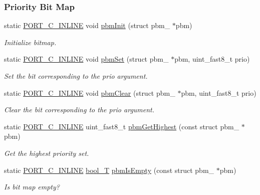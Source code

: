 \subsubsection*{Priority Bit Map}
\begin{DoxyCompactItemize}
\item 
static \hyperlink{group__template__compiler_ga87952d6e574c7f437503926e833ba345}{P\-O\-R\-T\-\_\-\-C\-\_\-\-I\-N\-L\-I\-N\-E} void \hyperlink{group__kern__impl_gaccc724ae39d88a6fcf21891c390ea845}{pbm\-Init} (struct pbm\-\_\- $\ast$pbm)
\begin{DoxyCompactList}\small\item\em Initialize bitmap. \end{DoxyCompactList}\item 
static \hyperlink{group__template__compiler_ga87952d6e574c7f437503926e833ba345}{P\-O\-R\-T\-\_\-\-C\-\_\-\-I\-N\-L\-I\-N\-E} void \hyperlink{group__kern__impl_gabd45c91981a68e1b23c765e8eb59b07b}{pbm\-Set} (struct pbm\-\_\- $\ast$pbm, uint\-\_\-fast8\-\_\-t prio)
\begin{DoxyCompactList}\small\item\em Set the bit corresponding to the prio argument. \end{DoxyCompactList}\item 
static \hyperlink{group__template__compiler_ga87952d6e574c7f437503926e833ba345}{P\-O\-R\-T\-\_\-\-C\-\_\-\-I\-N\-L\-I\-N\-E} void \hyperlink{group__kern__impl_ga53b46c788cfe6e4cc27ee6a3b6c1dfea}{pbm\-Clear} (struct pbm\-\_\- $\ast$pbm, uint\-\_\-fast8\-\_\-t prio)
\begin{DoxyCompactList}\small\item\em Clear the bit corresponding to the prio argument. \end{DoxyCompactList}\item 
static \hyperlink{group__template__compiler_ga87952d6e574c7f437503926e833ba345}{P\-O\-R\-T\-\_\-\-C\-\_\-\-I\-N\-L\-I\-N\-E} uint\-\_\-fast8\-\_\-t \hyperlink{group__kern__impl_ga126e2a40ac85cba9f8ce32b803cb8906}{pbm\-Get\-Highest} (const struct pbm\-\_\- $\ast$pbm)
\begin{DoxyCompactList}\small\item\em Get the highest priority set. \end{DoxyCompactList}\item 
static \hyperlink{group__template__compiler_ga87952d6e574c7f437503926e833ba345}{P\-O\-R\-T\-\_\-\-C\-\_\-\-I\-N\-L\-I\-N\-E} \hyperlink{group__template__compiler_ga74fbee312f9185efb602f89d21b53404}{bool\-\_\-\-T} \hyperlink{group__kern__impl_gae681fb07746d91e97533dfcd9d7b9a9c}{pbm\-Is\-Empty} (const struct pbm\-\_\- $\ast$pbm)
\begin{DoxyCompactList}\small\item\em Is bit map empty? \end{DoxyCompactList}\end{DoxyCompactItemize}
